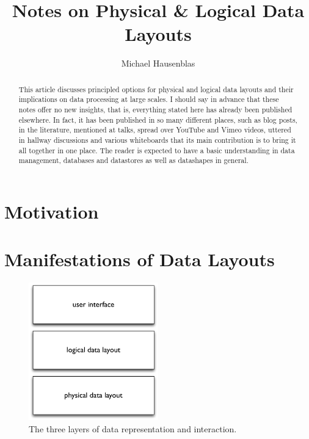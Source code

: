 \documentclass{llncs}
\begin{document}
\title{Notes on Physical \& Logical Data Layouts}
	\author{
	Michael Hausenblas 
	}
\maketitle

\begin{abstract}
This article discusses principled options for physical and logical data layouts
and their implications on data processing at large scales. I should say in 
advance that these notes offer no new insights, that is, everything stated here 
has already been published elsewhere. In fact, it has been published in so many 
different places, such as blog posts, in the literature, mentioned at talks, 
spread over YouTube and Vimeo videos, uttered in hallway discussions and 
various whiteboards that its main contribution is to bring it all together in 
one place. The reader is expected to have a basic understanding in data 
management, databases and datastores as well as datashapes in general.
\end{abstract}

\section{Motivation}
\label{sec:mot}


\section{Manifestations of Data Layouts}
\label{sec:mani}

\begin{figure}[h!]
\centering
\includegraphics[width=0.5\textwidth]{data-layers}
\caption{The three layers of data representation and interaction.}
\label{fig:data-layers}
\end{figure}
\end{document}

